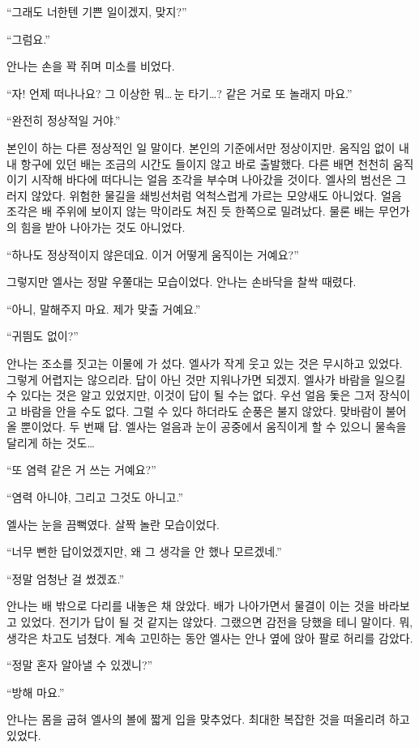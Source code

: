 ``그래도 너한텐 기쁜 일이겠지, 맞지?''

``그럼요.''

안나는 손을 꽉 쥐며 미소를 비었다.

``자! 언제 떠나나요? 그 이상한 뭐\ldots\,눈 타기\ldots? 같은 거로 또 놀래지 마요.''

``완전히 정상적일 거야.''

본인이 하는 다른 정상적인 일 말이다. 본인의 기준에서만 정상이지만. 움직임 없이 내내 항구에 있던 배는 조금의 시간도 들이지 않고 바로 출발했다. 다른 배면 천천히 움직이기 시작해 바다에 떠다니는 얼음 조각을 부수며 나아갔을 것이다. 엘사의 범선은 그러지 않았다. 위험한 물길을 쇄빙선처럼 억척스럽게 가르는 모양새도 아니었다. 얼음 조각은 배 주위에 보이지 않는 막이라도 쳐진 듯 한쪽으로 밀려났다. 물론 배는 무언가의 힘을 받아 나아가는 것도 아니었다.

``하나도 정상적이지 않은데요. 이거 어떻게 움직이는 거예요?''

그렇지만 엘사는 정말 우쭐대는 모습이었다. 안나는 손바닥을 찰싹 때렸다.

``아니, 말해주지 마요. 제가 맞출 거예요.''

``귀띔도 없이?''

안나는 조소를 짓고는 이물에 가 섰다. 엘사가 작게 웃고 있는 것은 무시하고 있었다. 그렇게 어렵지는 않으리라. 답이 아닌 것만 지워나가면 되겠지. 엘사가 바람을 일으킬 수 있다는 것은 알고 있었지만, 이것이 답이 될 수는 없다. 우선 얼음 돛은 그저 장식이고 바람을 안을 수도 없다. 그럴 수 있다 하더라도 순풍은 불지 않았다. 맞바람이 불어올 뿐이었다. 두 번째 답. 엘사는 얼음과 눈이 공중에서 움직이게 할 수 있으니 물속을 달리게 하는 것도\ldots

``또 염력 같은 거 쓰는 거예요?''

``염력 아니야, 그리고 그것도 아니고.''

엘사는 눈을 끔뻑였다. 살짝 놀란 모습이었다.

``너무 뻔한 답이었겠지만, 왜 그 생각을 안 했나 모르겠네.''

``정말 엄청난 걸 썼겠죠.''

안나는 배 밖으로 다리를 내놓은 채 앉았다. 배가 나아가면서 물결이 이는 것을 바라보고 있었다. 전기가 답이 될 것 같지는 않았다. 그랬으면 감전을 당했을 테니 말이다. 뭐, 생각은 차고도 넘쳤다. 계속 고민하는 동안 엘사는 안나 옆에 앉아 팔로 허리를 감았다.

``정말 혼자 알아낼 수 있겠니?''

``방해 마요.''

안나는 몸을 굽혀 엘사의 볼에 짧게 입을 맞추었다. 최대한 복잡한 것을 떠올리려 하고 있었다.

